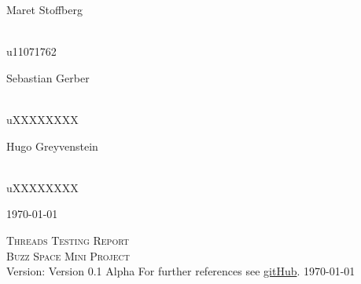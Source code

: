 \documentclass[a4paper,12pt]{report}
\begin{document}
\begin{titlepage}
\begin{center}
\begin{minipage}{0.4\textwidth}
\end{minipage}
\begin{minipage}{0.4\textwidth}
\begin{flushleft} \large
Maret {Stoffberg}
\end{flushleft}
\end{minipage}
\begin{minipage}{0.4\textwidth}
\begin{flushright} \large
\emph{} \\
u11071762
\end{flushright}
\end{minipage}
\begin{minipage}{0.4\textwidth}
\begin{flushleft} \large
Sebastian {Gerber}
\end{flushleft}
\end{minipage}
\begin{minipage}{0.4\textwidth}
\begin{flushright} \large
\emph{} \\
uXXXXXXXX
\end{flushright}
\end{minipage}
\begin{minipage}{0.4\textwidth}
\begin{flushleft} \large
Hugo {Greyvenstein}
\end{flushleft}
\end{minipage}
\begin{minipage}{0.4\textwidth}
\begin{flushright} \large
\emph{} \\
uXXXXXXXX
\end{flushright}
\end{minipage}
\vfill
{\large \today}
\end{center}
\end{titlepage}
%

\renewcommand{\thesection}{\arabic{section}}
\newpage
\begin{center}
\textsc{\LARGE Threads Testing Report}\\[1.5cm]
\textsc{\Large Buzz Space Mini Project}\\[0.5cm]
Version: Version 0.1 Alpha 
For further references see \href{https://github.com/thepickpocket/ThreadsTesting}{gitHub}.
\today
\end{center}

\newpage
\tableofcontents
\pagebreak
\end{document}
